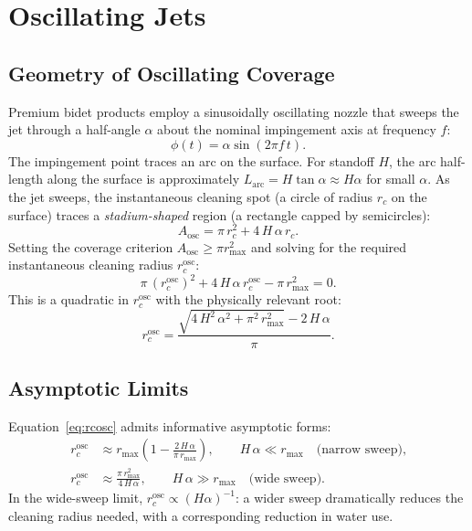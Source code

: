 \documentclass[aps,prfluids,reprint,amsmath,amssymb,floatfix]{revtex4-2}
\begin{document}
\section{Oscillating Jets}
\label{sec:oscillating}

\subsection{Geometry of Oscillating Coverage}
\label{subsec:osc_geom}

Premium bidet products employ a sinusoidally oscillating nozzle that sweeps
the jet through a half-angle $\alpha$ about the nominal impingement axis at
frequency $f$:
\begin{equation}
  \phi(t) = \alpha\sin(2\pi f\,t).
  \label{eq:phiosc}
\end{equation}
The impingement point traces an arc on the surface. For standoff $H$, the
arc half-length along the surface is approximately $L_\mathrm{arc} = H\tan\alpha
\approx H\alpha$ for small $\alpha$. As the jet sweeps, the instantaneous
cleaning spot (a circle of radius $r_c$ on the surface) traces a
\emph{stadium-shaped} region (a rectangle capped by semicircles):
\begin{equation}
  A_\mathrm{osc} = \pi\,r_c^2 + 4\,H\,\alpha\,r_c.
  \label{eq:Aosc}
\end{equation}
Setting the coverage criterion $A_\mathrm{osc} \geq \pi r_\mathrm{max}^2$
and solving for the required instantaneous cleaning radius $r_c^\mathrm{osc}$:
\begin{equation}
  \pi\,(r_c^\mathrm{osc})^2 + 4\,H\,\alpha\,r_c^\mathrm{osc}
  - \pi\,r_\mathrm{max}^2 = 0.
  \label{eq:stadiumquadratic}
\end{equation}
This is a quadratic in $r_c^\mathrm{osc}$ with the physically relevant root:
\begin{equation}
  r_c^\mathrm{osc} = \frac{\sqrt{4\,H^2\,\alpha^2 + \pi^2\,r_\mathrm{max}^2}
  - 2\,H\,\alpha}{\pi}.
  \label{eq:rcosc}
\end{equation}

\subsection{Asymptotic Limits}
\label{subsec:osc_limits}

Equation~\eqref{eq:rcosc} admits informative asymptotic forms:
\begin{align}
  r_c^\mathrm{osc} &\approx r_\mathrm{max}
  \left(1 - \frac{2\,H\,\alpha}{\pi\,r_\mathrm{max}}\right),
  \qquad H\,\alpha \ll r_\mathrm{max}
  \quad\text{(narrow sweep),}
  \label{eq:rcosc_narrow}\\
  r_c^\mathrm{osc} &\approx \frac{\pi\,r_\mathrm{max}^2}{4\,H\,\alpha},
  \qquad H\,\alpha \gg r_\mathrm{max}
  \quad\text{(wide sweep).}
  \label{eq:rcosc_wide}
\end{align}
In the wide-sweep limit, $r_c^\mathrm{osc} \propto (H\alpha)^{-1}$: a
wider sweep dramatically reduces the cleaning radius needed, with a
corresponding reduction in water use.
\end{document}
